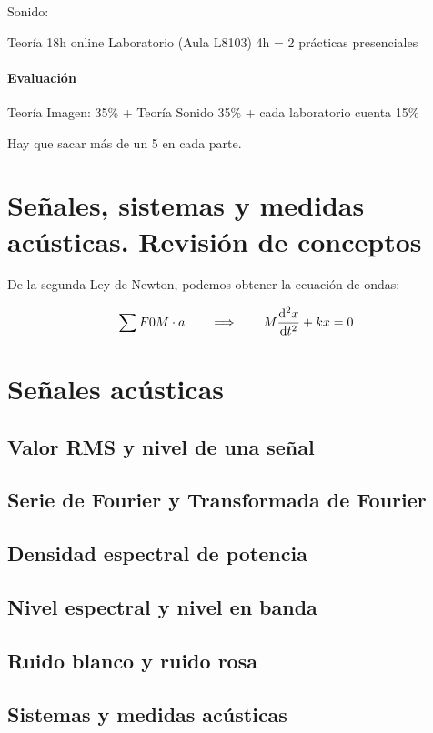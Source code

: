 \documentclass[a4paper]{book}
\begin{document}
Sonido:

Teoría 18h online
Laboratorio (Aula L8103) 4h = 2 prácticas presenciales

\subsubsection{Evaluación}
Teoría Imagen: 35\% + Teoría Sonido 35\% + cada laboratorio cuenta 15\%

Hay que sacar más de un 5 en cada parte.

\newpage

\setlength{\parskip}{0em}
\tableofcontents
\setlength{\parskip}{0.5em}

\chapter{Señales, sistemas y medidas acústicas. Revisión de conceptos}

De la segunda Ley de Newton, podemos obtener la ecuación de ondas:

\[ \sum F 0 M\cdot a \qquad \Longrightarrow \qquad M \dv[2]{x}{t} + kx = 0 \]

\chapter{Señales acústicas}
\section{Valor RMS y nivel de una señal}
\section{Serie de Fourier y Transformada de Fourier}
\section{Densidad espectral de potencia}
\section{Nivel espectral y nivel en banda}
\section{Ruido blanco y ruido rosa}
\section{Sistemas y medidas acústicas}
\end{document}
